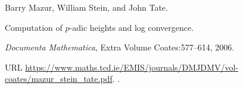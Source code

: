 Barry Mazur, William Stein, and John Tate.

\newblock Computation of $p$-adic heights and log convergence.

\newblock \emph{Documenta Mathematica}, Extra Volume Coates:577--614, 2006.

\newblock URL \url{https://www.maths.tcd.ie/EMIS/journals/DMJDMV/vol-coates/mazur_stein_tate.pdf}.
\newblock {}.
